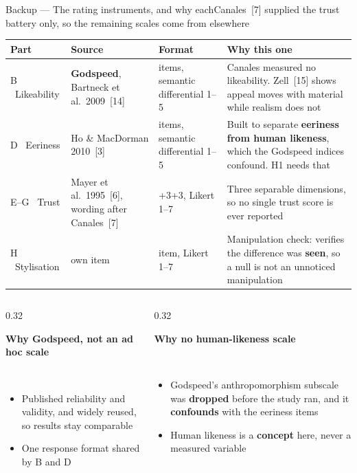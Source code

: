 \documentclass[aspectratio=169,10pt]{beamer}
\newcommand{\hl}[1]{{\color{knblue}\textbf{#1}}}
\newcommand{\bad}[1]{{\color{knred}\textbf{#1}}}
\newcommand{\panelheadsm}[1]{\noindent\colorbox{kncyan}{\parbox{0.96\textwidth}{\centering\vspace{1pt}\color{white}\tiny\bfseries #1\vspace{1pt}}}\\[0.2em]}
\newcommand{\panel}[1]{\noindent\colorbox{knlight}{\parbox{0.96\textwidth}{\vspace{2pt}\scriptsize
\begin{itemize}\setlength{\itemsep}{0.2em}\setlength{\leftmargini}{1.1em}#1\end{itemize}\vspace{2pt}}}}
\begin{document}
\begin{frame}{Backup — The rating instruments, and why each}{Canales~[7] supplied the trust battery only, so the remaining scales come from elsewhere}
  \vspace{0.2em}
  {\scriptsize
  \setlength{\tabcolsep}{4pt}\renewcommand{\arraystretch}{1.25}
  \begin{tabular}{@{}>{\raggedright\arraybackslash}m{}>{\raggedright\arraybackslash}m{}>{\raggedright\arraybackslash}m{}>{\raggedright\arraybackslash}m{}@{}}
    \toprule
    \textbf{Part} & \textbf{Source} & \textbf{Format} & \textbf{Why this one} \\
    \midrule
    B \ Likeability & \hl{Godspeed}, Bartneck et al.\ 2009~[14] & 5 items, semantic differential 1--5 & Canales measured no likeability. Zell~[15] shows appeal moves with material while realism does not \\
    D \ Eeriness & Ho \& MacDorman 2010~[3] & 8 items, semantic differential 1--5 & Built to separate \hl{eeriness from human likeness}, which the Godspeed indices confound. H1 needs that \\
    E--G \ Trust & Mayer et al.\ 1995~[6], wording after Canales~[7] & 3+3+3, Likert 1--7 & Three separable dimensions, so no single trust score is ever reported \\
    H \ Stylisation & own item & 1 item, Likert 1--7 & Manipulation check: verifies the difference was \hl{seen}, so a null is not an unnoticed manipulation \\
    \bottomrule
  \end{tabular}\par}
  \vspace{0.45em}
  \begin{columns}[T]
    \begin{column}{0.32\textwidth}
      \panelheadsm{Why Godspeed, not an ad hoc scale}
      \panel{%
        \item Published reliability and validity, and widely reused, so results stay comparable
        \item One response format shared by B and D}
    \end{column}
    \begin{column}{0.32\textwidth}
      \panelheadsm{Why no human-likeness scale}
      \panel{%
        \item Godspeed's anthropomorphism subscale was \bad{dropped} before the study ran, and it \bad{confounds} with the eeriness items
        \item Human likeness is a \hl{concept} here, never a measured variable}

\end{column}
\end{columns}
\end{frame}
\end{document}
